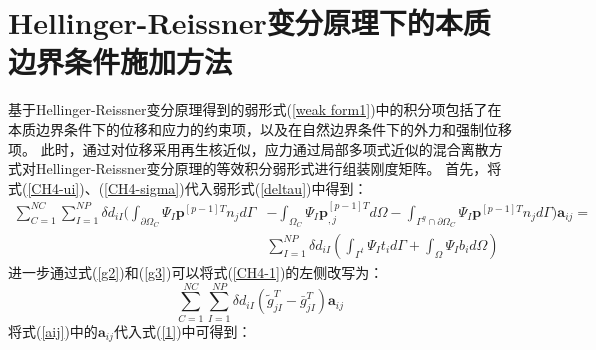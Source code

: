 \section{Hellinger-Reissner变分原理下的本质边界条件施加方法}
基于Hellinger-Reissner变分原理得到的弱形式(\ref{weak form1})中的积分项包括了在本质边界条件下的位移和应力的约束项，以及在自然边界条件下的外力和强制位移项。
此时，通过对位移采用再生核近似，应力通过局部多项式近似的混合离散方式对Hellinger-Reissner变分原理的等效积分弱形式进行组装刚度矩阵。
首先，将式(\ref{CH4-ui})、(\ref{CH4-sigma})代入弱形式(\ref{deltau})中得到：
\begin{equation}
\begin{split}\label{CH4-1}
\sum_{C=1}^{N\!C}\sum_{I=1}^{N\!P}\delta d_{iI}(\int_{\partial\Omega_C}\Psi_I\pmb{p}^{[p-1]T}n_jd\Gamma&-\int_{\Omega_C}\Psi_I\pmb{p}_{,j}^{[p-1]T}d\Omega-\int_{\Gamma^g\cap\partial\Omega_C}\Psi_I\pmb{p}^{[p-1]T}n_jd\Gamma)\pmb{a}_{ij}=\\
&\sum_{I=1}^{N\!P}\delta d_{iI}(\int_{\Gamma^t}\Psi_It_id\Gamma+\int_{\Omega}\Psi_Ib_id\Omega)
\end{split}
\end{equation}
进一步通过式(\ref{g2})和(\ref{g3})可以将式(\ref{CH4-1})的左侧改写为：
\begin{equation}\label{1}
    \sum_{C=1}^{N\!C}\sum_{I=1}^{N\!P}\delta d_{iI}(\tilde{g}_{jI}^T-\bar{g}_{jI}^T)\pmb{a}_{ij}
\end{equation}
将式(\ref{aij})中的$\pmb{a}_{ij}$代入式(\ref{1})中可得到：
